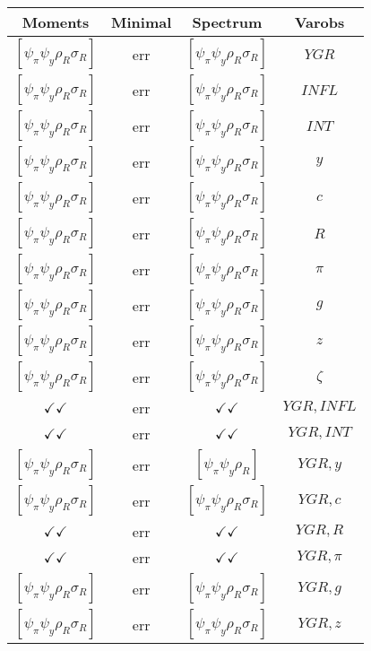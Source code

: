 \documentclass[a4paper,10pt]{article}
\begin{document}
\centering
\begin{longtable}{|c|c|c|c|}
\hline
Moments & Minimal & Spectrum & Varobs \\
\hline
$[\psi_\pi \psi_y \rho_R \sigma_R ]$ & err & $[\psi_\pi \psi_y \rho_R \sigma_R ]$ & ${YGR}$ \\
\hline
$[\psi_\pi \psi_y \rho_R \sigma_R ]$ & err & $[\psi_\pi \psi_y \rho_R \sigma_R ]$ & ${INFL}$ \\
\hline
$[\psi_\pi \psi_y \rho_R \sigma_R ]$ & err & $[\psi_\pi \psi_y \rho_R \sigma_R ]$ & ${INT}$ \\
\hline
$[\psi_\pi \psi_y \rho_R \sigma_R ]$ & err & $[\psi_\pi \psi_y \rho_R \sigma_R ]$ & ${y}$ \\
\hline
$[\psi_\pi \psi_y \rho_R \sigma_R ]$ & err & $[\psi_\pi \psi_y \rho_R \sigma_R ]$ & ${c}$ \\
\hline
$[\psi_\pi \psi_y \rho_R \sigma_R ]$ & err & $[\psi_\pi \psi_y \rho_R \sigma_R ]$ & ${R}$ \\
\hline
$[\psi_\pi \psi_y \rho_R \sigma_R ]$ & err & $[\psi_\pi \psi_y \rho_R \sigma_R ]$ & ${\pi}$ \\
\hline
$[\psi_\pi \psi_y \rho_R \sigma_R ]$ & err & $[\psi_\pi \psi_y \rho_R \sigma_R ]$ & ${g}$ \\
\hline
$[\psi_\pi \psi_y \rho_R \sigma_R ]$ & err & $[\psi_\pi \psi_y \rho_R \sigma_R ]$ & ${z}$ \\
\hline
$[\psi_\pi \psi_y \rho_R \sigma_R ]$ & err & $[\psi_\pi \psi_y \rho_R \sigma_R ]$ & ${\zeta}$ \\
\hline
$\checkmark\checkmark$ & err & $\checkmark\checkmark$ & ${YGR},{INFL}$ \\
\hline
$\checkmark\checkmark$ & err & $\checkmark\checkmark$ & ${YGR},{INT}$ \\
\hline
$[\psi_\pi \psi_y \rho_R \sigma_R ]$ & err & $[\psi_\pi \psi_y \rho_R ]$ & ${YGR},{y}$ \\
\hline
$[\psi_\pi \psi_y \rho_R \sigma_R ]$ & err & $[\psi_\pi \psi_y \rho_R \sigma_R ]$ & ${YGR},{c}$ \\
\hline
$\checkmark\checkmark$ & err & $\checkmark\checkmark$ & ${YGR},{R}$ \\
\hline
$\checkmark\checkmark$ & err & $\checkmark\checkmark$ & ${YGR},{\pi}$ \\
\hline
$[\psi_\pi \psi_y \rho_R \sigma_R ]$ & err & $[\psi_\pi \psi_y \rho_R \sigma_R ]$ & ${YGR},{g}$ \\
\hline
$[\psi_\pi \psi_y \rho_R \sigma_R ]$ & err & $[\psi_\pi \psi_y \rho_R \sigma_R ]$ & ${YGR},{z}$ \\

\end{longtable}
\end{document}
